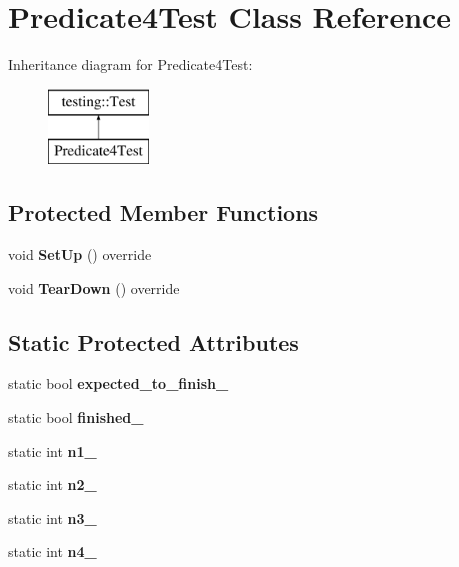 \hypertarget{classPredicate4Test}{}\section{Predicate4\+Test Class Reference}
\label{classPredicate4Test}
Inheritance diagram for Predicate4\+Test\+:\begin{figure}[H]
\begin{center}
\leavevmode
\includegraphics[height=2.000000cm]{classPredicate4Test}
\end{center}
\end{figure}
\subsection*{Protected Member Functions}
\begin{DoxyCompactItemize}
\item 
\mbox{\label{classPredicate4Test_ac27e833a2c7b3f889a01ad0a5bde18c6}} 
void {\bfseries Set\+Up} () override
\item 
\mbox{\label{classPredicate4Test_ad1af4f8c283659c3af2c52a62de3435d}} 
void {\bfseries Tear\+Down} () override
\end{DoxyCompactItemize}
\subsection*{Static Protected Attributes}
\begin{DoxyCompactItemize}
\item 
\mbox{\label{classPredicate4Test_a20600b5eda187c42ce4e812e77269654}} 
static bool {\bfseries expected\+\_\+to\+\_\+finish\+\_\+}
\item 
\mbox{\label{classPredicate4Test_acfd174bf9dfb5a91afbcdca17e797888}} 
static bool {\bfseries finished\+\_\+}
\item 
\mbox{\label{classPredicate4Test_a8eb30cd283e613f7a2e501a3969be9ae}} 
static int {\bfseries n1\+\_\+}
\item 
\mbox{\label{classPredicate4Test_a088fce743c747e3851c926cb3a87fda3}} 
static int {\bfseries n2\+\_\+}
\item 
\mbox{\label{classPredicate4Test_a00ae6ae54c7d6639d448c036aedb6114}} 
static int {\bfseries n3\+\_\+}
\item 
\mbox{\label{classPredicate4Test_ae42e23ce11e3f1c6b813496d6180cc67}} 
static int {\bfseries n4\+\_\+}
\end{DoxyCompactItemize}
